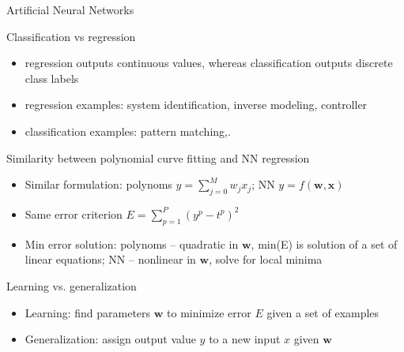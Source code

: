 \documentclass[9pt,t]{beamer}
\begin{document}
\begin{frame}{Artificial Neural Networks}
    \begin{alertblock}{Classification vs regression}
        \begin{itemize}
            \item regression outputs continuous values, whereas classification outputs discrete class labels
            \item regression examples: system identification, inverse modeling, controller
            \item classification examples: pattern matching,.
        \end{itemize}
    \end{alertblock}
    \begin{alertblock}{Similarity between polynomial curve fitting and NN regression}
        \begin{itemize}
            \item Similar formulation: polynoms $y = \sum_{j = 0}^{M} w_j x_j$; NN $y = f (\textbf{w}, \textbf{x})$
            \item Same error criterion $E = \sum_{p = 1}^{P}(y^p - t^p) ^2$
            \item Min error solution: polynoms -- quadratic in $\textbf{w}$, min(E) is solution of a set of linear equations; NN -- nonlinear in $\textbf{w}$, solve for local minima
        \end{itemize}
    \end{alertblock}
    \begin{alertblock}{Learning vs. generalization}
        \begin{itemize}
            \item Learning: find parameters $\textbf{w}$ to minimize error $ E $ given a set of examples
            \item Generalization: assign output value $ y $ to a new input $ x $ given $ \textbf{w} $
        \end{itemize}
    \end{alertblock}
\end{frame}
\end{document}
